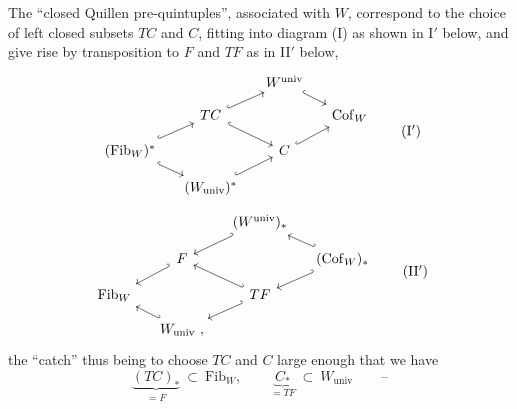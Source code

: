 \documentclass[11pt]{article}
\newcommand{\Cof}{\mathrm{Cof}}
\newcommand{\Fib}{\mathrm{Fib}}
\newcommand{\univ}{\mathrm{univ}}
\begin{document}
The ``closed Quillen pre-quintuples'', associated with $W$, correspond to the choice of left closed subsets $TC$ and $C$, fitting into diagram (I) as shown in I$'$ below, and give rise by transposition to $F$ and $TF$ as in II$'$ below,
\[
\begin{tikzcd}[column sep=small, row sep=small]
 & & W^{\univ} \arrow[dr, hook] & \\
 & TC \arrow[ur, hook] \arrow[dr, hook] & & \Cof_W \\
(\Fib_W)^* \arrow[ur, hook] \arrow[dr, hook] & & C \arrow[ur, hook] & \\
 & (W_{\univ})^* \arrow[ur, hook] & &
\end{tikzcd}
\tag*{(I$'$)}
\]
\[
\begin{tikzcd}[column sep=small, row sep=small]
 & & (W^{\univ})_* \arrow[dl, hook'] & \\
 & F \arrow[dl, hook'] & & (\Cof_W)_* \arrow[ul, hook'] \arrow[dl, hook'] \\
\Fib_W & & TF \arrow[ul, hook'] \arrow[dl, hook'] & \\
 & W_{\univ}\ , \arrow[ul, hook'] & &
\end{tikzcd}
\tag*{(II$'$)}
\]
the ``catch'' thus being to choose $TC$ and $C$ large enough that we have
\[ \underbrace{(TC)_*}_{= F} \ \subset\ \Fib_W, \qquad \underbrace{C_*}_{= TF} \ \subset\ W_{\univ} \qquad \text{--} \]
\end{document}

